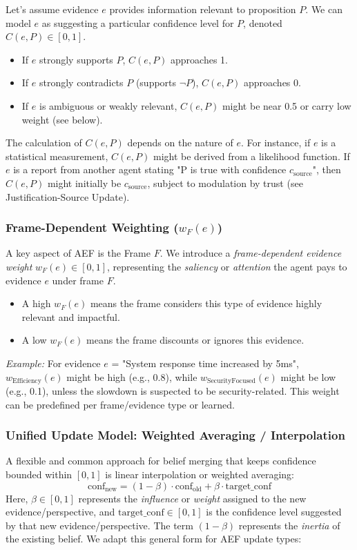\documentclass[10pt,a4paper]{article}
\begin{document}
Let's assume evidence $e$ provides information relevant to proposition $P$. We can model $e$ as suggesting a particular confidence level for $P$, denoted $C(e, P) \in [0, 1]$.
\begin{itemize}
    \item If $e$ strongly supports $P$, $C(e, P)$ approaches 1.
    \item If $e$ strongly contradicts $P$ (supports $\neg P$), $C(e, P)$ approaches 0.
    \item If $e$ is ambiguous or weakly relevant, $C(e, P)$ might be near 0.5 or carry low weight (see below).
\end{itemize}
The calculation of $C(e, P)$ depends on the nature of $e$. For instance, if $e$ is a statistical measurement, $C(e, P)$ might be derived from a likelihood function. If $e$ is a report from another agent stating "P is true with confidence $c_{\mathrm{source}}$", then $C(e, P)$ might initially be $c_{\mathrm{source}}$, subject to modulation by trust (see Justification-Source Update).

\subsubsection{Frame-Dependent Weighting ($w_F(e)$)}

A key aspect of AEF is the Frame $F$. We introduce a \textit{frame-dependent evidence weight} $w_F(e) \in [0, 1]$, representing the \textit{saliency} or \textit{attention} the agent pays to evidence $e$ under frame $F$.
\begin{itemize}
    \item A high $w_F(e)$ means the frame considers this type of evidence highly relevant and impactful.
    \item A low $w_F(e)$ means the frame discounts or ignores this evidence.
\end{itemize}
\textit{Example:} For evidence $e$ = "System response time increased by 5ms", $w_{\mathrm{Efficiency}}(e)$ might be high (e.g., 0.8), while $w_{\mathrm{SecurityFocused}}(e)$ might be low (e.g., 0.1), unless the slowdown is suspected to be security-related. This weight can be predefined per frame/evidence type or learned.

\subsubsection{Unified Update Model: Weighted Averaging / Interpolation}

A flexible and common approach for belief merging that keeps confidence bounded within $[0, 1]$ is linear interpolation or weighted averaging:
$$ \mathrm{conf}_{\mathrm{new}} = (1 - \beta) \cdot \mathrm{conf}_{\mathrm{old}} + \beta \cdot \mathrm{target\_conf} $$
Here, $\beta \in [0, 1]$ represents the \textit{influence} or \textit{weight} assigned to the new evidence/perspective, and $\mathrm{target\_conf} \in [0, 1]$ is the confidence level suggested by that new evidence/perspective. The term $(1 - \beta)$ represents the \textit{inertia} of the existing belief. We adapt this general form for AEF update types:
\end{document}
